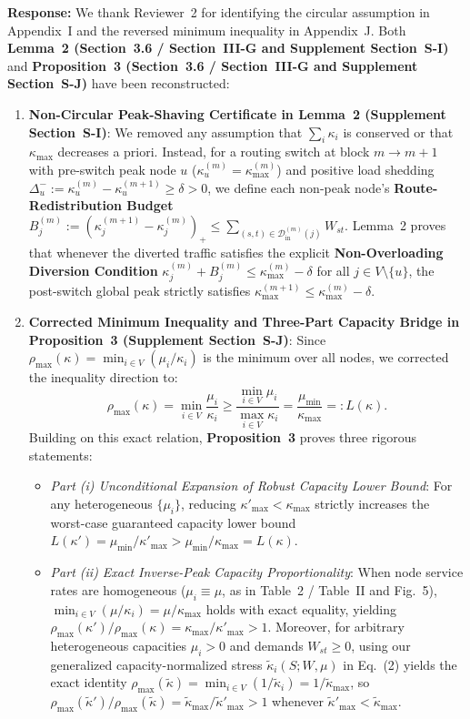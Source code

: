 \documentclass[11pt,a4paper]{article}
\begin{document}
\noindent\textbf{Response:} We thank Reviewer~2 for identifying the circular assumption in Appendix~I and the reversed minimum inequality in Appendix~J. Both \textbf{Lemma~2 (Section~3.6 / Section~III-G and Supplement Section~S-I)} and \textbf{Proposition~3 (Section~3.6 / Section~III-G and Supplement Section~S-J)} have been reconstructed:
\begin{enumerate}[leftmargin=1.8em]
    \item \textbf{Non-Circular Peak-Shaving Certificate in Lemma~2 (Supplement Section~S-I)}: We removed any assumption that $\sum_i \kappa_i$ is conserved or that $\kappa_{\max}$ decreases a priori. Instead, for a routing switch at block $m \to m+1$ with pre-switch peak node $u$ ($\kappa_u^{(m)} = \kappa_{\max}^{(m)}$) and positive load shedding $\Delta_u^- := \kappa_u^{(m)} - \kappa_u^{(m+1)} \ge \delta > 0$, we define each non-peak node's \textbf{Route-Redistribution Budget} $B_j^{(m)} := (\kappa_j^{(m+1)} - \kappa_j^{(m)})_+ \le \sum_{(s,t)\in\mathcal{D}_{\text{in}}^{(m)}(j)} W_{st}$. Lemma~2 proves that whenever the diverted traffic satisfies the explicit \textbf{Non-Overloading Diversion Condition} $\kappa_j^{(m)} + B_j^{(m)} \le \kappa_{\max}^{(m)} - \delta$ for all $j \in V \setminus \{u\}$, the post-switch global peak strictly satisfies $\kappa_{\max}^{(m+1)} \le \kappa_{\max}^{(m)} - \delta$.
    \item \textbf{Corrected Minimum Inequality and Three-Part Capacity Bridge in Proposition~3 (Supplement Section~S-J)}: Since $\rho_{\max}(\kappa) = \min_{i\in V}(\mu_i/\kappa_i)$ is the minimum over all nodes, we corrected the inequality direction to:
    \[
        \rho_{\max}(\kappa) = \min_{i \in V}\frac{\mu_i}{\kappa_i} \ge \frac{\min_{i\in V}\mu_i}{\max_{i\in V}\kappa_i} = \frac{\mu_{\min}}{\kappa_{\max}} =: L(\kappa).
    \]
    Building on this exact relation, \textbf{Proposition~3} proves three rigorous statements:
    \begin{itemize}
        \item \textit{Part (i) Unconditional Expansion of Robust Capacity Lower Bound}: For any heterogeneous $\{\mu_i\}$, reducing $\kappa'_{\max} < \kappa_{\max}$ strictly increases the worst-case guaranteed capacity lower bound $L(\kappa') = \mu_{\min}/\kappa'_{\max} > \mu_{\min}/\kappa_{\max} = L(\kappa)$.
        \item \textit{Part (ii) Exact Inverse-Peak Capacity Proportionality}: When node service rates are homogeneous ($\mu_i \equiv \mu$, as in Table~2 / Table~II and Fig.~5), $\min_{i\in V}(\mu/\kappa_i) = \mu/\kappa_{\max}$ holds with exact equality, yielding $\rho_{\max}(\kappa')/\rho_{\max}(\kappa) = \kappa_{\max}/\kappa'_{\max} > 1$. Moreover, for arbitrary heterogeneous capacities $\mu_i > 0$ and demands $W_{st} \ge 0$, using our generalized capacity-normalized stress $\widetilde{\kappa}_i(S;W,\mu)$ in Eq.~(2) yields the exact identity $\rho_{\max}(\widetilde{\kappa}) = \min_{i\in V}(1/\widetilde{\kappa}_i) = 1/\widetilde{\kappa}_{\max}$, so $\rho_{\max}(\widetilde{\kappa}')/\rho_{\max}(\widetilde{\kappa}) = \widetilde{\kappa}_{\max}/\widetilde{\kappa}'_{\max} > 1$ whenever $\widetilde{\kappa}'_{\max} < \widetilde{\kappa}_{\max}$.

\end{itemize}
\end{enumerate}
\end{document}
